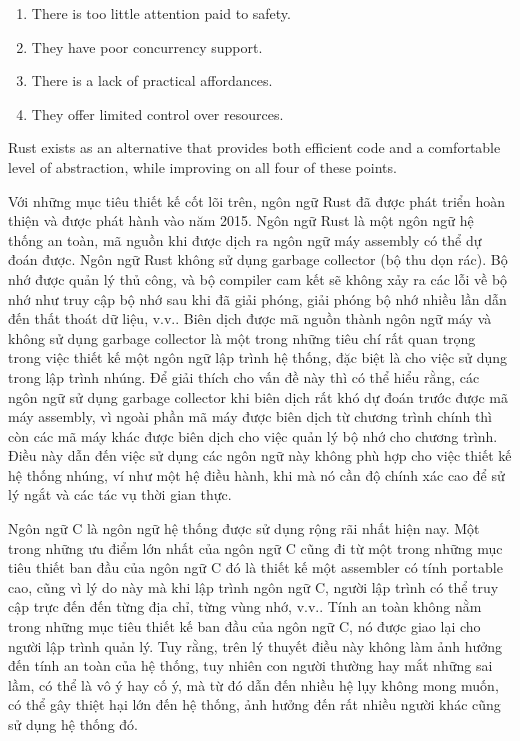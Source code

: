 \begin{enumerate}
\item There is too little attention paid to safety.
\item They have poor concurrency support.
\item There is a lack of practical affordances.
\item They offer limited control over resources.
\end{enumerate}

Rust exists as an alternative that provides both efficient code and a comfortable level of abstraction, while improving on all four of these points.

\bigskip

Với những mục tiêu thiết kế cốt lõi trên, ngôn ngữ Rust đã được phát triển hoàn thiện và được phát hành vào năm 2015.
Ngôn ngữ Rust là một ngôn ngữ hệ thống an toàn, mã nguồn khi được dịch ra ngôn ngữ máy assembly có thể dự đoán được.
Ngôn ngữ Rust không sử dụng garbage collector (bộ thu dọn rác). Bộ nhớ được quản lý thủ công, và bộ compiler cam kết sẽ không xảy ra các lỗi về bộ nhớ như truy cập bộ nhớ sau khi đã giải phóng, giải phóng bộ nhớ nhiều lần dẫn đến thất thoát dữ liệu, v.v..
Biên dịch được mã nguồn thành ngôn ngữ máy và không sử dụng garbage collector là một trong những tiêu chí rất quan trọng trong việc thiết kế một ngôn ngữ lập trình hệ thống, đặc biệt là cho việc sử dụng trong lập trình nhúng.
Để giải thích cho vấn đề này thì có thể hiểu rằng, các ngôn ngữ sử dụng garbage collector khi biên dịch rất khó dự đoán trước được mã máy assembly, vì ngoài phần mã máy được biên dịch từ chương trình chính thì còn các mã máy khác được biên dịch cho việc quản lý bộ nhớ cho chương trình.
Điều này dẫn đến việc sử dụng các ngôn ngữ này không phù hợp cho việc thiết kế hệ thống nhúng, ví như một hệ điều hành, khi mà nó cần độ chính xác cao để sử lý ngắt và các tác vụ thời gian thực.

Ngôn ngữ C là ngôn ngữ hệ thống được sử dụng rộng rãi nhất hiện nay. Một trong những ưu điểm lớn nhất của ngôn ngữ C cũng đi từ một trong những mục tiêu thiết ban đầu của ngôn ngữ C đó là thiết kế một assembler có tính portable cao, cũng vì lý do này mà khi lập trình ngôn ngữ C, người lập trình có thể truy cập trực đến đến từng địa chỉ, từng vùng nhớ, v.v.. Tính an toàn không nằm trong những mục tiêu thiết kế ban đầu của ngôn ngữ C, nó được giao lại cho người lập trình quản lý. Tuy rằng, trên lý thuyết điều này không làm ảnh hưởng đến tính an toàn của hệ thống, tuy nhiên con người thường hay mắt những sai lầm, có thể là vô ý hay cố ý, mà từ đó dẫn đến nhiều hệ lụy không mong muốn, có thể gây thiệt hại lớn đến hệ thống, ảnh hưởng đến rất nhiều người khác cũng sử dụng hệ thống đó.

